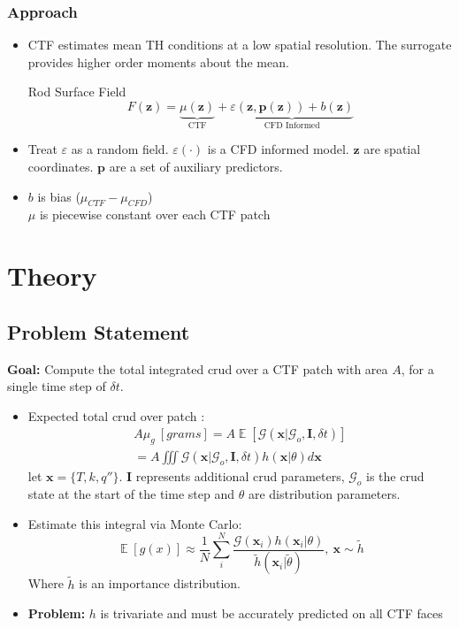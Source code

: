 \documentclass[t, pdftex]{beamer}
\DeclareMathOperator*{\E}{\mathbb{E}}
\begin{document}
\begin{frame}
    \frametitle{Approach}
    \vspace{-8pt}
    \begin{itemize}
    \item CTF estimates mean TH conditions at a low spatial resolution.  The surrogate provides higher order moments about the mean.
    
    \begin{block}{Rod Surface Field}
        \[ 
        F(\mathbf z) = \underbrace{\mu(\mathbf{z})}_\text{CTF} + \underbrace{\varepsilon(\mathbf z, {\mathbf p(\mathbf z)}) + b(\mathbf{z}) }_\text{CFD Informed}
        \]
    \end{block}
    \item Treat $\varepsilon$ as a random field.  $\varepsilon(\cdot)$ is a CFD informed model. $\mathbf z$ are spatial coordinates. $\mathbf p$ are a set of auxiliary predictors. \\
    \item $b$ is bias ($\mu_{CTF} - \mu_{CFD}$) \\
    $\mu$ is piecewise constant over each CTF patch
\end{itemize}
\end{frame}

\section[Theory]{Theory}
\subsection*{Problem Statement}
\begin{frame}
\textbf{Goal:} Compute the total integrated crud over a CTF patch with area $A$, for a single time step of $\delta t$.
\begin{itemize}
	\item Expected total crud over patch : 
	\begin{eqnarray}
		A \mu_g\ [grams] = A \E[\mathcal G(\mathbf x|\mathcal G_o, \mathbf I, \delta t)] \nonumber \\
		= A \iiint \mathcal G(\mathbf x|\mathcal G_o, \mathbf I, \delta t) h(\mathbf x|\theta) d \mathbf x  \nonumber
	\end{eqnarray}
	let $\mathbf x= \{T, k, q''\}$.
	$\mathbf I$ represents additional crud parameters, $\mathcal G_o$ is the crud state at the start of the time step and $\theta$ are distribution parameters.
	\item Estimate this integral via Monte Carlo:
	\[
	\E[g(x)] \approx \frac{1}{N} \sum_i^N \frac{\mathcal G(\mathbf x_i) 
	h(\mathbf x_i | \theta)}{\tilde h(\mathbf x_i | \tilde \theta)}, \ \mathbf x \sim \tilde h
	\]
	Where $\tilde h$ is an importance distribution. 
    \item \textbf{Problem:} $h$ is trivariate and must be accurately predicted on all CTF faces
\end{itemize}
\end{frame}
\end{document}
